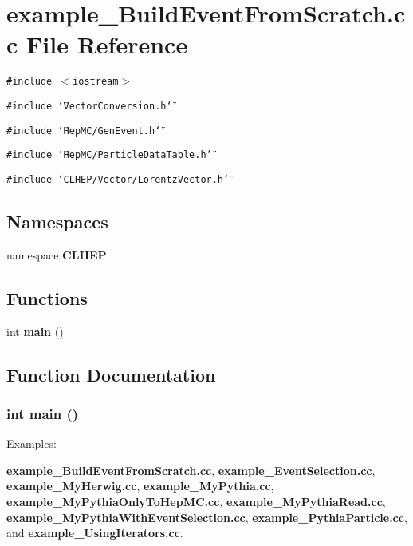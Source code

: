 \section{example\_\-Build\-Event\-From\-Scratch.cc File Reference}
\label{example__BuildEventFromScratch_8cc}
{\tt \#include $<$iostream$>$}\par
{\tt \#include \char`\"{}Vector\-Conversion.h\char`\"{}}\par
{\tt \#include \char`\"{}Hep\-MC/Gen\-Event.h\char`\"{}}\par
{\tt \#include \char`\"{}Hep\-MC/Particle\-Data\-Table.h\char`\"{}}\par
{\tt \#include \char`\"{}CLHEP/Vector/Lorentz\-Vector.h\char`\"{}}\par
\subsection*{Namespaces}
\begin{CompactItemize}
\item 
namespace {\bf CLHEP}
\end{CompactItemize}
\subsection*{Functions}
\begin{CompactItemize}
\item 
int {\bf main} ()
\end{CompactItemize}


\subsection{Function Documentation}
\subsubsection{\setlength{\rightskip}{0pt plus 5cm}int main ()}\label{example__BuildEventFromScratch_8cc_e66f6b31b5ad750f1fe042a706a4e3d4}


\begin{Desc}
\item[Examples: ]\par
{\bf example\_\-Build\-Event\-From\-Scratch.cc}, {\bf example\_\-Event\-Selection.cc}, {\bf example\_\-My\-Herwig.cc}, {\bf example\_\-My\-Pythia.cc}, {\bf example\_\-My\-Pythia\-Only\-To\-Hep\-MC.cc}, {\bf example\_\-My\-Pythia\-Read.cc}, {\bf example\_\-My\-Pythia\-With\-Event\-Selection.cc}, {\bf example\_\-Pythia\-Particle.cc}, and {\bf example\_\-Using\-Iterators.cc}.\end{Desc}



